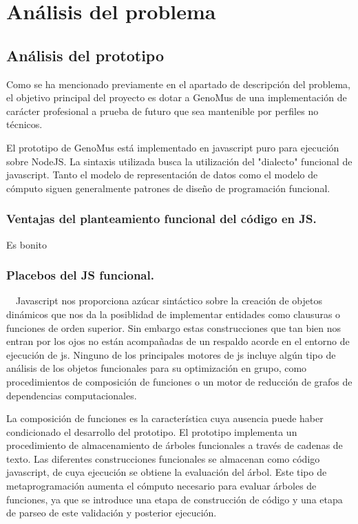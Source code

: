\chapter{Análisis del problema}

\section{Análisis del prototipo}
 
Como se ha mencionado previamente en el apartado de descripción del problema, el objetivo principal del proyecto es dotar a GenoMus de una implementación de carácter profesional a prueba de futuro que sea mantenible por perfiles no técnicos.

El prototipo de GenoMus está implementado en javascript puro para ejecución sobre NodeJS. La sintaxis utilizada busca la utilización del "dialecto" funcional de javascript. Tanto el modelo de representación de datos como el modelo de cómputo siguen generalmente patrones de diseño de programación funcional. 

\subsection{Ventajas del planteamiento funcional del código en JS.}
Es bonito

\subsection{Placebos del JS funcional.} \ \
Javascript nos proporciona azúcar sintáctico sobre la creación de objetos dinámicos que nos da la posiblidad de implementar entidades como clausuras o funciones de orden superior. Sin embargo estas construcciones que tan bien nos entran por los ojos no están acompañadas de un respaldo acorde en el entorno de ejecución de js. Ninguno de los principales motores de js incluye algún tipo de análisis de los objetos funcionales para su optimización en grupo, como procedimientos de composición de funciones o un motor de reducción de grafos de dependencias computacionales.

La composición de funciones es la característica cuya ausencia puede haber condicionado el desarrollo del prototipo. El prototipo implementa un procedimiento de almacenamiento de árboles funcionales a través de cadenas de texto. Las diferentes construcciones funcionales se almacenan como código javascript, de cuya ejecución se obtiene la evaluación del árbol. Este tipo de metaprogramación aumenta el cómputo necesario para evaluar árboles de funciones, ya que se introduce una etapa de construcción de código y una etapa de parseo de este validación y posterior ejecución.

